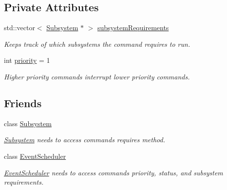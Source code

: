 \subsection*{Private Attributes}
\begin{DoxyCompactItemize}
\item 
std\+::vector$<$ \mbox{\hyperlink{classlib_iterative_robot_1_1_subsystem}{Subsystem}} $\ast$ $>$ \mbox{\hyperlink{classlib_iterative_robot_1_1_command_abbedf025246921d5cde67aa954b74d35}{subsystem\+Requirements}}
\begin{DoxyCompactList}\small\item\em Keeps track of which subsystems the command requires to run. \end{DoxyCompactList}\item 
\mbox{\label{classlib_iterative_robot_1_1_command_af2fd312376da33f5eba582db90389511}} 
int \mbox{\hyperlink{classlib_iterative_robot_1_1_command_af2fd312376da33f5eba582db90389511}{priority}} = 1
\begin{DoxyCompactList}\small\item\em Higher priority commands interrupt lower priority commands. \end{DoxyCompactList}\end{DoxyCompactItemize}
\subsection*{Friends}
\begin{DoxyCompactItemize}
\item 
\mbox{\label{classlib_iterative_robot_1_1_command_a9b67dc4c93b18626e753aa0938abbf7d}} 
class \mbox{\hyperlink{classlib_iterative_robot_1_1_command_a9b67dc4c93b18626e753aa0938abbf7d}{Subsystem}}
\begin{DoxyCompactList}\small\item\em \mbox{\hyperlink{classlib_iterative_robot_1_1_subsystem}{Subsystem}} needs to access commands\textquotesingle{} requires method. \end{DoxyCompactList}\item 
\mbox{\label{classlib_iterative_robot_1_1_command_a2a47195be57876de9e0c9e18467a34a3}} 
class \mbox{\hyperlink{classlib_iterative_robot_1_1_command_a2a47195be57876de9e0c9e18467a34a3}{Event\+Scheduler}}
\begin{DoxyCompactList}\small\item\em \mbox{\hyperlink{classlib_iterative_robot_1_1_event_scheduler}{Event\+Scheduler}} needs to access commands\textquotesingle{} priority, status, and subsystem requirements. \end{DoxyCompactList}\end{DoxyCompactItemize}


